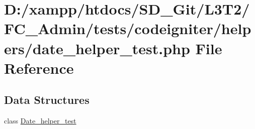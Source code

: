 \hypertarget{date__helper__test_8php}{}\section{D\+:/xampp/htdocs/\+S\+D\+\_\+\+Git/\+L3\+T2/\+F\+C\+\_\+\+Admin/tests/codeigniter/helpers/date\+\_\+helper\+\_\+test.php File Reference}
\label{date__helper__test_8php}
\subsection*{Data Structures}
\begin{DoxyCompactItemize}
\item 
class \hyperlink{class_date__helper__test}{Date\+\_\+helper\+\_\+test}
\end{DoxyCompactItemize}
